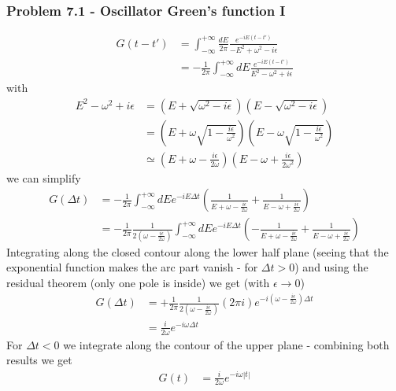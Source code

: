 \documentclass[10pt,a4paper]{book}
\theoremstyle{definition}
\begin{document}
\subsubsection{Problem 7.1 - Oscillator Green's function I}
\begin{align}
G(t-t')&=\int_{-\infty}^{+\infty}\frac{dE}{2\pi}\frac{e^{-iE(t-t')}}{-E^2+\omega^2-i\epsilon}\\
&=-\frac{1}{2\pi}\int_{-\infty}^{+\infty}dE\frac{e^{-iE(t-t')}}{E^2-\omega^2+i\epsilon}
\end{align}
with
\begin{align}
E^2-\omega^2+i\epsilon
&=(E+\sqrt{\omega^2-i\epsilon})(E-\sqrt{\omega^2-i\epsilon})\\
&=\left(E+\omega\sqrt{1-\frac{i\epsilon}{\omega^2}}\right)\left(E-\omega\sqrt{1-\frac{i\epsilon}{\omega^2}}\right)\\
&\simeq\left(E+\omega-\frac{i\epsilon}{2\omega}\right)\left(E-\omega+\frac{i\epsilon}{2\omega^2}\right)
\end{align}
we can simplify
\begin{align}
G(\Delta t)
&=-\frac{1}{2\pi}\int_{-\infty}^{+\infty}dEe^{-iE\Delta t}\left(\frac{1}{E+\omega-\frac{i\epsilon}{2\omega}}+\frac{1}{E-\omega+\frac{i\epsilon}{2\omega}}\right)\\
&=-\frac{1}{2\pi}\frac{1}{2\left(\omega-\frac{i\epsilon}{2\omega}\right)}\int_{-\infty}^{+\infty}dEe^{-iE\Delta t}\left(-\frac{1}{E+\omega-\frac{i\epsilon}{2\omega}}+\frac{1}{E-\omega+\frac{i\epsilon}{2\omega}}\right)
\end{align}
Integrating along the closed contour along the lower half plane (seeing that the exponential function makes the arc part vanish - for $\Delta t>0$) and using the residual theorem (only one pole is inside) we get (with $\epsilon\rightarrow0$)
\begin{align}
G(\Delta t)
&=+\frac{1}{2\pi}\frac{1}{2\left(\omega-\frac{i\epsilon}{2\omega}\right)}(2\pi i)e^{-i(\omega-\frac{i\epsilon}{2\omega})\Delta t}\\
&=\frac{i}{2\omega}e^{-i\omega\Delta t}
\end{align}
For $\Delta t<0$ we integrate along the contour of the upper plane - combining both results we get
\begin{align}
G(t)&=\frac{i}{2\omega}e^{-i\omega|t|}
\end{align}
\end{document}

